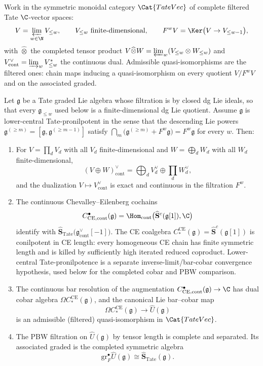 \documentclass[11pt]{memoir}
\begin{document}
\begin{lem}\label{lem:continuous-bar-cobar}
  Work in the symmetric monoidal category $\Cat{TateVec}$ of complete
  filtered Tate $\C$-vector spaces:
  $$V=\varprojlim_{w\in\N}V_{\leq w},\qquad V_{\leq w}\
    \text{finite-dimensional},\qquad
    F^w V=\Ker\bigl(V\to V_{\leq w-1}\bigr),$$
  with $\widehat\otimes$ the completed tensor product
  $V\widehat\otimes W=\varprojlim_w(V_{\leq w}\otimes W_{\leq w})$ and
  $V^\vee_{\mathrm{cont}}=\varinjlim_w V_{\leq w}^*$ the continuous
  dual. Admissible quasi-isomorphisms are the filtered ones: chain
  maps inducing a quasi-isomorphism on every quotient $V/F^wV$ and on
  the associated graded.

  Let $\mathfrak g$ be a Tate graded Lie algebra whose filtration is by
  closed dg Lie ideals, so that every \(\mathfrak g_{\leq w}\) used below
  is a finite-dimensional dg Lie quotient.  Assume \(\mathfrak g\) is
  lower-central Tate-pronilpotent in the
  sense that the descending Lie powers $\mathfrak g^{(\geq m)}=
  [\mathfrak g,\mathfrak g^{(\geq m-1)}]$ satisfy
  $\bigcap_m\bigl(\mathfrak g^{(\geq m)}+F^w\mathfrak g\bigr)=
  F^w\mathfrak g$ for every $w$. Then:
  \begin{enumerate}
    \item For $V=\prod_d V_d$ with all $V_d$ finite-dimensional and
      $W=\bigoplus_d W_d$ with all $W_d$ finite-dimensional,
      $$(V\oplus W)^\vee_{\mathrm{cont}}=
        \bigoplus_d V_d^\vee\oplus\prod_d W_d^\vee,$$
      and the dualization $V\mapsto V^\vee_{\mathrm{cont}}$ is exact and
      continuous in the filtration $F^w$.
    \item The continuous Chevalley--Eilenberg cochains
      $$C^\bullet_{\mathrm{CE},\mathrm{cont}}(\mathfrak g)
        =\Hom_{\mathrm{cont}}\bigl(\widehat{\mathbf S}^c(\mathfrak g[1]),
        \C\bigr)$$
      identify with $\widehat{\mathbf S}_{\mathrm{Tate}}\bigl(
        \mathfrak g^\vee_{\mathrm{cont}}[-1]\bigr)$. The CE coalgebra
      $C_*^{\mathrm{CE}}(\mathfrak g)=\widehat{\mathbf S}^c(\mathfrak g[1])$
      is conilpotent in CE length: every homogeneous CE chain has finite
      symmetric length and is killed by sufficiently high iterated reduced
      coproduct. Lower-central Tate-pronilpotence is a separate
      inverse-limit/bar-cobar convergence hypothesis, used below for the
      completed cobar and PBW comparison.
    \item The continuous bar resolution of the augmentation
      $C^\bullet_{\mathrm{CE},\mathrm{cont}}(\mathfrak g)\to\C$ has
      dual cobar algebra $\Omega C_*^{\mathrm{CE}}(\mathfrak g)$, and
      the canonical Lie bar--cobar map
      $$\Omega C_*^{\mathrm{CE}}(\mathfrak g)\longrightarrow
        \widehat U(\mathfrak g)$$
      is an admissible (filtered) quasi-isomorphism in $\Cat{TateVec}$.
    \item The PBW filtration on $\widehat U(\mathfrak g)$ by tensor
      length is complete and separated. Its associated graded is the
      completed symmetric algebra
      $$\mathrm{gr}_F^\bullet\widehat U(\mathfrak g)\cong
        \widehat{\mathbf S}_{\mathrm{Tate}}(\mathfrak g).$$
  \end{enumerate}
\end{lem}
\end{document}
